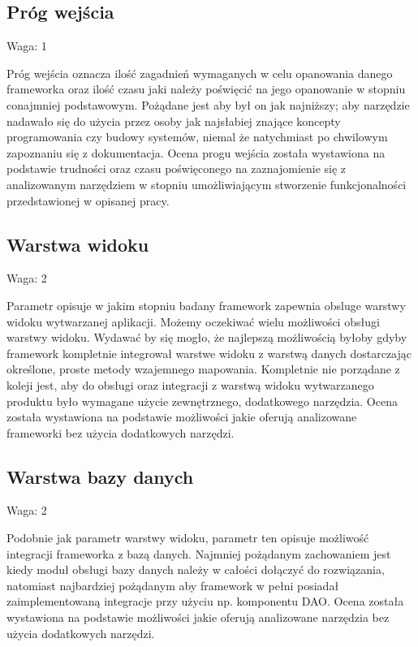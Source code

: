 \documentclass[12pt]{report}
\begin{document}
    \subsection{Próg wejścia}
      \begin{description}
        \item Waga: 1
      \end{description}
      Próg wejścia oznacza ilość zagadnień wymaganych w celu opanowania danego frameworka oraz ilość czasu jaki należy poświęcić na jego opanowanie w stopniu conajmniej podstawowym.
      Pożądane jest aby był on jak najniższy; aby narzędzie nadawało się do użycia przez osoby jak najsłabiej znające koncepty programowania czy budowy systemów, niemal że natychmiast po chwilowym zapoznaniu się z dokumentacja.
      Ocena progu wejścia została wystawiona na podstawie trudności oraz czasu poświęconego na zaznajomienie się z analizowanym narzędziem w stopniu umożliwiającym stworzenie funkcjonalności przedstawionej w opisanej pracy.

    \subsection{Warstwa widoku}
      \begin{description}
        \item Waga: 2
      \end{description}
      Parametr opisuje w jakim stopniu badany framework zapewnia obsluge warstwy widoku wytwarzanej aplikacji.
      Możemy oczekiwać wielu możliwości obsługi warstwy widoku.
      Wydawać by się mogło, że najlepszą możliwością byłoby gdyby framework kompletnie integrował warstwe widoku z warstwą danych dostarczając określone, proste metody wzajemnego mapowania.
      Kompletnie nie porządane z koleji jest, aby do obsługi oraz integracji z warstwą widoku wytwarzanego produktu było wymagane użycie zewnętrznego, dodatkowego narzędzia.
      Ocena została wystawiona na podstawie możliwości jakie oferują analizowane frameworki bez użycia dodatkowych narzędzi.

    \subsection{Warstwa bazy danych}
      \begin{description}
        \item Waga: 2
      \end{description}
      Podobnie jak parametr warstwy widoku, parametr ten opisuje możliwość integracji frameworka z bazą danych.
      Najmniej pożądanym zachowaniem jest kiedy moduł obsługi bazy danych należy w całości dołączyć do rozwiązania, natomiast najbardziej pożądanym aby framework w pełni posiadał zaimplementowaną integracje przy użyciu np. komponentu DAO.
      Ocena została wystawiona na podstawie możliwości jakie oferują analizowane narzędzia bez użycia dodatkowych narzędzi.
\end{document}

